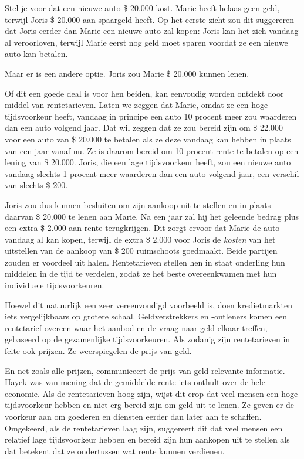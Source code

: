 \documentclass[
  a5paper,
  smalldemyvopaper,11pt,twoside,onecolumn,openright,extrafontsizes,
hidelinks]{memoir}
\begin{document}
Stel je voor dat een nieuwe auto \$ 20.000 kost. Marie heeft helaas geen
geld, terwijl Joris \$ 20.000 aan spaargeld heeft. Op het eerste zicht
zou dit suggereren dat Joris eerder dan Marie een nieuwe auto zal kopen:
Joris kan het zich vandaag al veroorloven, terwijl Marie eerst nog geld
moet sparen voordat ze een nieuwe auto kan betalen.

Maar er is een andere optie. Joris zou Marie \$ 20.000 kunnen lenen.

Of dit een goede deal is voor hen beiden, kan eenvoudig worden ontdekt
door middel van rentetarieven. Laten we zeggen dat Marie, omdat ze een
hoge tijdsvoorkeur heeft, vandaag in principe een auto 10 procent meer
zou waarderen dan een auto volgend jaar. Dat wil zeggen dat ze zou
bereid zijn om \$ 22.000 voor een auto van \$ 20.000 te betalen als ze
deze vandaag kan hebben in plaats van een jaar vanaf nu. Ze is daarom
bereid om 10 procent rente te betalen op een lening van \$ 20.000.
Joris, die een lage tijdsvoorkeur heeft, zou een nieuwe auto vandaag
slechts 1 procent meer waarderen dan een auto volgend jaar, een verschil
van slechts \$ 200.

Joris zou dus kunnen besluiten om zijn aankoop uit te stellen en in
plaats daarvan \$ 20.000 te lenen aan Marie. Na een jaar zal hij het
geleende bedrag plus een extra \$ 2.000 aan rente terugkrijgen. Dit
zorgt ervoor dat Marie de auto vandaag al kan kopen, terwijl de extra \$
2.000 voor Joris de \emph{kosten} van het uitstellen van de aankoop van
\$ 200 ruimschoots goedmaakt. Beide partijen zouden er voordeel uit
halen. Rentetarieven stellen hen in staat onderling hun middelen in de
tijd te verdelen, zodat ze het beste overeenkwamen met hun individuele
tijdsvoorkeuren.

Hoewel dit natuurlijk een zeer vereenvoudigd voorbeeld is, doen
kredietmarkten iets vergelijkbaars op grotere schaal. Geldverstrekkers
en -ontleners komen een rentetarief overeen waar het aanbod en de vraag
naar geld elkaar treffen, gebaseerd op de gezamenlijke tijdsvoorkeuren.
Als zodanig zijn rentetarieven in feite ook prijzen. Ze weerspiegelen de
prijs van geld.

En net zoals alle prijzen, communiceert de prijs van geld relevante
informatie. Hayek was van mening dat de gemiddelde rente iets onthult
over de hele economie. Als de rentetarieven hoog zijn, wijst dit erop
dat veel mensen een hoge tijdsvoorkeur hebben en niet erg bereid zijn om
geld uit te lenen. Ze geven er de voorkeur aan om goederen en diensten
eerder dan later aan te schaffen. Omgekeerd, als de rentetarieven laag
zijn, suggereert dit dat veel mensen een relatief lage tijdsvoorkeur
hebben en bereid zijn hun aankopen uit te stellen als dat betekent dat
ze ondertussen wat rente kunnen verdienen.
\end{document}
